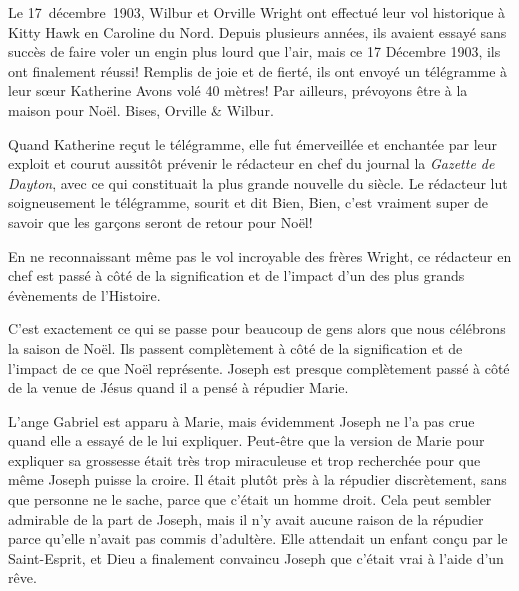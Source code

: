 

Le 17~décembre~1903, Wilbur et Orville Wright ont effectué leur vol historique à Kitty Hawk en Caroline du Nord. Depuis plusieurs années, ils avaient essayé sans succès de faire voler un engin plus lourd que l'air, mais ce 17 Décembre 1903, ils ont finalement réussi! Remplis de joie et de fierté, ils ont envoyé un télégramme à leur sœur Katherine\frcolon{} \Og Avons volé 40 mètres! Par ailleurs, prévoyons être à la maison pour Noël. Bises, Orville \& Wilbur. \Fg{}

Quand Katherine reçut le télégramme, elle fut émerveillée et enchantée par leur exploit et courut aussitôt prévenir le rédacteur en chef du journal la \emph{Gazette de Dayton}, avec ce qui constituait la plus grande nouvelle du siècle. Le rédacteur lut soigneusement le télégramme, sourit et dit\frcolon{} \Og Bien, Bien, c'est vraiment super de savoir que les garçons seront de retour pour Noël! \Fg{}

En ne reconnaissant même pas le vol incroyable des frères Wright, ce rédacteur en chef est passé à côté de la signification et de l'impact d'un des plus grands évènements de l'Histoire.

C'est exactement ce qui se passe pour beaucoup de gens alors que nous célébrons la saison de Noël. Ils passent complètement à côté de la signification et de l'impact de ce que Noël représente. Joseph est presque complètement passé à côté de la venue de Jésus quand il a pensé à répudier Marie.

L'ange Gabriel est apparu à Marie, mais évidemment Joseph ne l'a pas crue quand elle a essayé de le lui expliquer. Peut-être que la version de Marie pour expliquer sa grossesse était très trop miraculeuse et trop recherchée pour que même Joseph puisse la croire. Il était plutôt près à la répudier discrètement, sans que personne ne le sache, parce que c'était un homme droit. Cela peut sembler admirable de la part de Joseph, mais il n'y avait aucune raison de la répudier parce qu'elle n'avait pas commis d'adultère. Elle attendait un enfant conçu par le Saint-Esprit, et Dieu a finalement convaincu Joseph que c'était vrai à l'aide d'un rêve.

